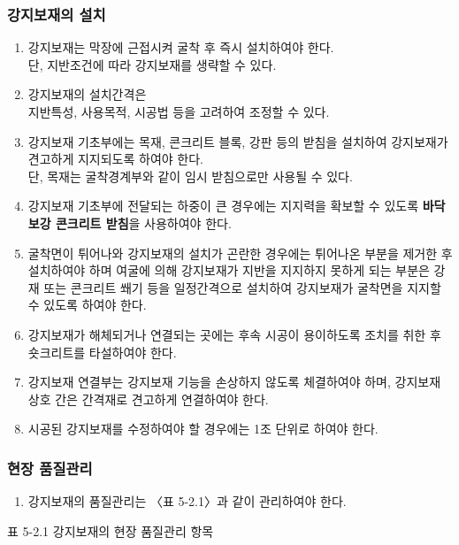 \documentclass[12pt,a4paper]{article}
\begin{document}
\subsubsection{강지보재의 설치}

\begin{enumerate}
\item 강지보재는 막장에 근접시켜 굴착 후 즉시 설치하여야 한다. \\ 단, 지반조건에 따라 강지보재를 생략할 수 있다.  
\item 강지보재의 설치간격은 \\ 지반특성, 사용목적, 시공법 등을 고려하여 조정할 수 있다.  
\item 강지보재 기초부에는 목재, 콘크리트 블록, 강판 등의 받침을 설치하여 강지보재가 견고하게 지지되도록 하여야 한다. 
      \\ 단, 목재는 굴착경계부와 같이 임시 받침으로만 사용될 수 있다.  
\item 강지보재 기초부에 전달되는 하중이 큰 경우에는 지지력을 확보할 수 있도록 \textbf {바닥보강 콘크리트 받침}을 사용하여야 한다.  
\item 굴착면이 튀어나와 강지보재의 설치가 곤란한 경우에는 튀어나온 부분을 제거한 후 설치하여야 하며 
      여굴에 의해 강지보재가 지반을 지지하지 못하게 되는 부분은 강재 또는 콘크리트 쐐기 등을 일정간격으로 설치하여 
      강지보재가 굴착면을 지지할 수 있도록 하여야 한다.  
\item 강지보재가 해체되거나 연결되는 곳에는 후속 시공이 용이하도록 조치를 취한 후 숏크리트를 타설하여야 한다.  
\item 강지보재 연결부는 강지보재 기능을 손상하지 않도록 체결하여야 하며, 강지보재 상호 간은 간격재로 견고하게 연결하여야 한다.  
\item 시공된 강지보재를 수정하여야 할 경우에는 1조 단위로 하여야 한다.  
\end{enumerate}


\subsubsection{현장 품질관리}

\begin{enumerate}
\item 강지보재의 품질관리는 〈표 5-2.1〉과 같이 관리하여야 한다.  
\end{enumerate}
   
   
표 5-2.1 강지보재의 현장 품질관리 항목

%
%
%
\end{document}

